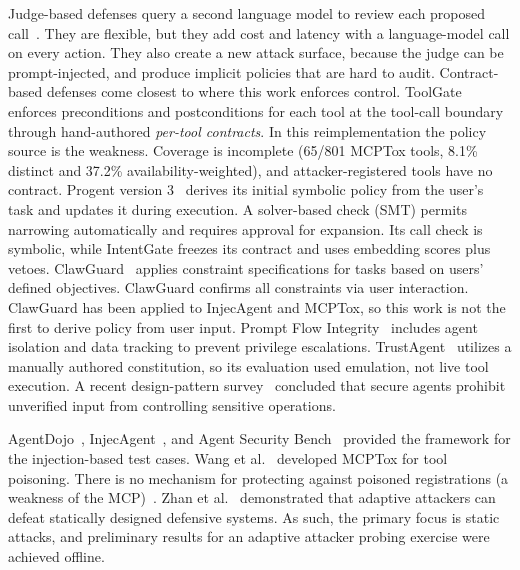 \documentclass[a4paper,conference]{IEEEtran}
\begin{document}
Judge-based defenses query a second language model to review each proposed call~\cite{taskshield2025}. They are flexible, but they add cost and latency with a language-model call on every action. They also create a new attack surface, because the judge can be prompt-injected, and produce implicit policies that are hard to audit. Contract-based defenses come closest to where this work enforces control. ToolGate~\cite{liu2026toolgate} enforces preconditions and postconditions for each tool at the tool-call boundary through hand-authored \emph{per-tool contracts}. In this reimplementation the policy source is the weakness. Coverage is incomplete (65/801 MCPTox tools, 8.1\% distinct and 37.2\% availability-weighted), and attacker-registered tools have no contract. Progent version 3~\cite{shi2025progent} derives its initial symbolic policy from the user's task and updates it during execution. A solver-based check (SMT) permits narrowing automatically and requires approval for expansion. Its call check is symbolic, while IntentGate freezes its contract and uses embedding scores plus vetoes. ClawGuard~\cite{clawguard2026} applies constraint specifications for tasks based on users' defined objectives. ClawGuard confirms all constraints via user interaction. ClawGuard has been applied to InjecAgent and MCPTox, so this work is not the first to derive policy from user input. Prompt Flow Integrity~\cite{kim2025promptflow} includes agent isolation and data tracking to prevent privilege escalations. TrustAgent~\cite{hua2024trustagent} utilizes a manually authored constitution, so its evaluation used emulation, not live tool execution. A recent design-pattern survey~\cite{beurerkellner2025design} concluded that secure agents prohibit unverified input from controlling sensitive operations.

AgentDojo~\cite{debenedetti2024agentdojo}, InjecAgent~\cite{zhan2024injecagent}, and Agent Security Bench~\cite{zhang2025asb} provided the framework for the injection-based test cases. Wang et al.~\cite{wang2026mcptox} developed MCPTox for tool poisoning. There is no mechanism for protecting against poisoned registrations (a weakness of the MCP)~\cite{anthropic2024mcp,radosevich2025mcp}. Zhan et al.~\cite{zhan2025adaptive} demonstrated that adaptive attackers can defeat statically designed defensive systems. As such, the primary focus is static attacks, and preliminary results for an adaptive attacker probing exercise were achieved offline.
\end{document}
